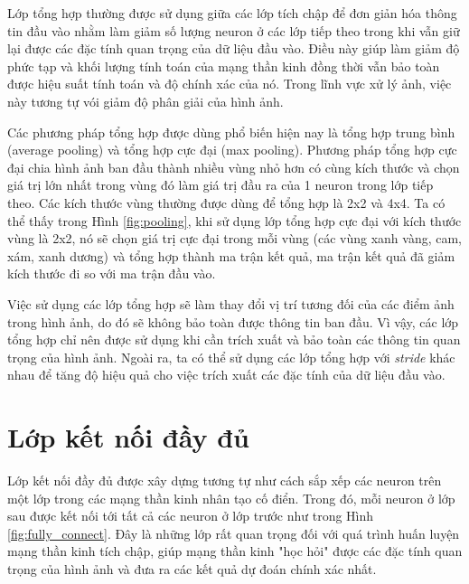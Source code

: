 \documentclass[a4paper]{article}
\begin{document}
Lớp tổng hợp thường được sử dụng giữa các lớp tích chập để đơn giản hóa thông tin đầu vào nhằm làm giảm số lượng neuron ở các lớp tiếp theo trong khi vẫn giữ lại được các đặc tính quan trọng của dữ liệu đầu vào. Điều này giúp làm giảm độ phức tạp và khối lượng tính toán của mạng thần kinh đồng thời vẫn bảo toàn được hiệu suất tính toán và độ chính xác của nó. Trong lĩnh vực xử lý ảnh, việc này tương tự vói giảm độ phân giải của hình ảnh. \par

\vspace{0.35cm}

Các phương pháp tổng hợp được dùng phổ biến hiện nay là tổng hợp trung bình (average pooling) và tổng hợp cực đại (max pooling). Phương pháp tổng hợp cực đại chia hình ảnh ban đầu thành nhiều vùng nhỏ hơn có cùng kích thước và chọn giá trị lớn nhất trong vùng đó làm giá trị đầu ra của 1 neuron trong lớp tiếp theo. Các kích thước vùng thường được dùng để tổng hợp là 2x2 và 4x4. Ta có thể thấy trong Hình \ref{fig:pooling}, khi sử dụng lớp tổng hợp cực đại với kích thước vùng là 2x2, nó sẽ chọn giá trị cực đại trong mỗi vùng (các vùng xanh vàng, cam, xám, xanh dương) và tổng hợp thành ma trận kết quả, ma trận kết quả đã giảm kích thước đi so với ma trận đầu vào. \par



Việc sử dụng các lớp tổng hợp sẽ làm thay đổi vị trí tương đối của các điểm ảnh trong hình ảnh, do đó sẽ không bảo toàn được thông tin ban đầu. Vì vậy, các lớp tổng hợp chỉ nên được sử dụng khi cần trích xuất và bảo toàn các thông tin quan trọng của hình ảnh. Ngoài ra, ta có thể sử dụng các lớp tổng hợp với \textit{stride} khác nhau để tăng độ hiệu quả cho việc trích xuất các đặc tính của dữ liệu đầu vào. 

\section{Lớp kết nối đầy đủ}

\vspace{0.35cm}

Lớp kết nối đầy đủ được xây dựng tương tự như cách sắp xếp các neuron trên một lớp trong các mạng thần kinh nhân tạo cố điển. Trong đó, mỗi neuron ở lớp sau được kết nối tới tất cả các neuron ở lớp trước như trong Hình \ref{fig:fully_connect}. Đây là những lớp rất quan trọng đối với quá trình huấn luyện mạng thần kinh tích chập, giúp mạng thần kinh "học hỏi" được các đặc tính quan trọng của hình ảnh và đưa ra các kết quả dự đoán chính xác nhất. \par
\end{document}
